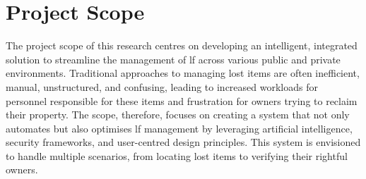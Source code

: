 





\section{Project Scope} \label{app:ad-project-scope}

The project scope of this research centres on developing an intelligent, integrated solution to streamline the management of \ac{lf} across various public and private environments. Traditional approaches to managing lost items are often inefficient, manual, unstructured, and confusing, leading to increased workloads for personnel responsible for these items and frustration for owners trying to reclaim their property. The scope, therefore, focuses on creating a system that not only automates but also optimises \ac{lf} management by leveraging artificial intelligence, security frameworks, and user-centred design principles. This system is envisioned to handle multiple scenarios, from locating lost items to verifying their rightful owners.


